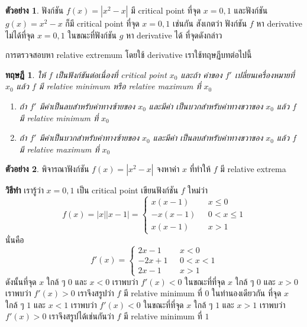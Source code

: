 \documentclass[
]{book}
\newtheorem{theorem}{ทฤษฎี}[chapter]
\theoremstyle{definition}
\theoremstyle{definition}
\newtheorem{example}{ตัวอย่าง}[chapter]
\theoremstyle{definition}
\theoremstyle{definition}
\theoremstyle{remark}
\begin{document}
\begin{example}
ฟังก์ชัน \(f(x) = |x^2-x|\) มี critical point ที่จุด \(x=0,1\) และฟังก์ชัน \(g(x) =
x^2-x\) ก็มี critical point ที่จุด \(x=0,1\) เช่นกัน สังเกตว่า ฟังก์ชัน \(f\) หา
derivative ไม่ได้ที่จุด \(x=0,1\) ในขณะที่ฟังก์ชัน \(g\) หา derivative ได้ ที่จุดดังกล่าว
\end{example}

การตรวจสอบหา relative extremum โดยใช้ derivative เราใช้ทฤษฏีบทต่อไปนี้

\begin{theorem}

ให้ \(f\) เป็นฟังก์ชันต่อเนื่องที่ critical point \(x_0\) และถ้า ค่าของ \(f'\)
เปลี่ยนเครื่องหมายที่ \(x_0\) แล้ว \(f\) มี relative minimum หรือ relative maximum ที่
\(x_0\)

\begin{enumerate}
\def\labelenumi{\arabic{enumi}.}
\item
  ถ้า \(f'\) มีค่าเป็นลบสำหรับค่าทางซ้ายของ \(x_0\) และมีค่า เป็นบวกสำหรับค่าทางขวาของ
  \(x_0\) แล้ว \(f\) มี relative minimum ที่ \(x_0\)
\item
  ถ้า \(f'\) มีค่าเป็นบวกสำหรับค่าทางซ้ายของ \(x_0\) และมีค่า เป็นลบสำหรับค่าทางขวาของ
  \(x_0\) แล้ว \(f\) มี relative maximum ที่ \(x_0\)
\end{enumerate}

\end{theorem}

\begin{example}
พิจารณาฟังก์ชัน \(f(x) = |x^2-x|\) จงหาค่า \(x\) ที่ทำให้ \(f\) มี relative extrema
\end{example}

\textbf{วิธีทำ} เรารู้ว่า \(x=0,1\) เป็น critical point เขียนฟังก์ชัน \(f\) ใหม่ว่า
\[f(x) = |x||x-1| = \begin{cases}
    x(x-1) & \text{ $x \le 0$}  \\
    -x(x-1) & \text{ $0< x \le 1$} \\
    x(x-1) & \text{ $x > 1$}
    \end{cases}\] นั่นคือ \[f'(x) = \begin{cases}
    2x-1 & \text{ $x < 0$} \\
    -2x+1 & \text{ $0 < x < 1$} \\
    2x-1 & \text{ $x> 1$}
    \end{cases}\] ดังนั้นที่จุด \(x\) ใกล้ ๆ \(0\) และ \(x<0\) เราพบว่า \(f'(x) < 0\)
ในขณะที่ที่จุด \(x\) ใกล้ ๆ \(0\) และ \(x>0\) เราพบว่า \(f'(x) > 0\) เราจึงสรูปว่า \(f\) มี
relative minimum ที่ \(0\) ในทำนองเดียวกัน ที่จุด \(x\) ใกล้ ๆ \(1\) และ \(x<1\) เราพบว่า
\(f'(x) < 0\) ในขณะที่ที่จุด \(x\) ใกล้ ๆ \(1\) และ \(x>1\) เราพบว่า \(f'(x) > 0\)
เราจึงสรูปได้เช่นกันว่า \(f\) มี relative minimum ที่ \(1\)
\end{document}
